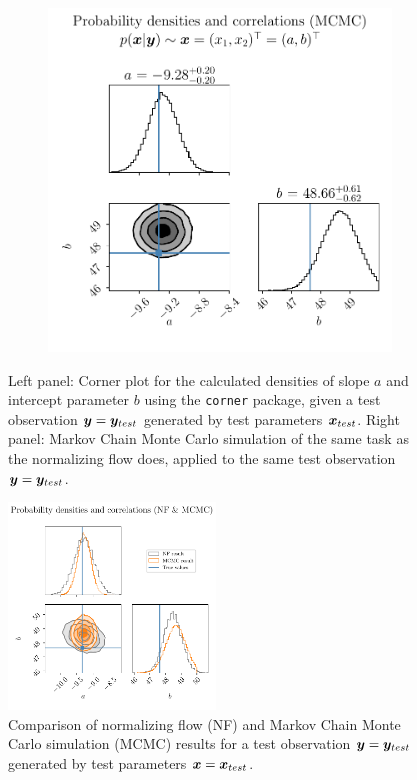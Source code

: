 \documentclass[a4paper,12pt]{report}
\begin{document}
\begin{figure}[h!]
\begin{subfigure}[t]{0.49\textwidth}
	\includegraphics[width=\textwidth]{figures/nf-linear-regression-example-corner-mcmc.pdf}
	\end{subfigure}
\cprotect\caption{Left panel: Corner plot for the calculated densities of slope $a$ and intercept parameter $b$ using the \verb|corner| package, given a test observation $\bm{y} = \bm{y}_{test}$ generated by test parameters $\bm{x}_{test}$. Right panel: Markov Chain Monte Carlo simulation of the same task as the normalizing flow does, applied to the same test observation $\bm{y} = \bm{y}_{test}$.}
\label{fig:linear-regression-results}
\end{figure}

\begin{figure}[h!]
\centering
\includegraphics[width=0.49\textwidth]{figures/nf-linear-regression-example-corner-mcmc-nf.pdf}
\caption{Comparison of normalizing flow (NF) and Markov Chain Monte Carlo simulation (MCMC) results for a test observation $\bm{y} = \bm{y}_{test}$ generated by test parameters $\bm{x} = \bm{x}_{test}$.}
\label{fig:nf-linear-regression-example-corner-mcmc-nf}
\end{figure}
\end{document}
